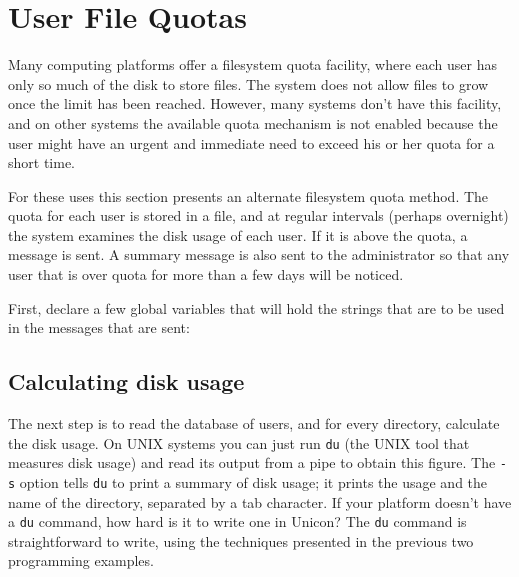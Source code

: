 \section{User File Quotas}

Many computing platforms offer a filesystem quota facility,
where each user has only so much of the disk to store files. The
system does not allow files to grow once the
limit has been reached. However, many systems don't
have this facility, and on other systems the available quota mechanism
is not enabled because the user might have an urgent and immediate need
to exceed his or her quota for a short time.

For these uses this section presents an alternate filesystem quota
method. The quota for each user is stored in a file, and at regular
intervals (perhaps overnight) the system examines the disk usage of
each user. If it is above the quota, a message is sent. A summary
message is also sent to the administrator so that any user that is over
quota for more than a few days will be noticed.

First, declare a few global variables that will hold the strings that
are to be used in the messages that are sent: 


\subsection*{Calculating disk usage}

The next step is to read the database of users, and for every
directory, calculate the disk usage. On
UNIX systems you can just run \texttt{du} (the UNIX tool that
measures disk usage) and read its output from a pipe to obtain this
figure. The \texttt{{}-s} option tells \texttt{du} to print a summary
of disk usage; it prints the usage and the name of the directory,
separated by a tab character. If your platform doesn't
have a \texttt{du} command, how hard is it to write one in Unicon? The
\texttt{du} command is straightforward to write, using
the techniques presented in the previous two programming examples.

